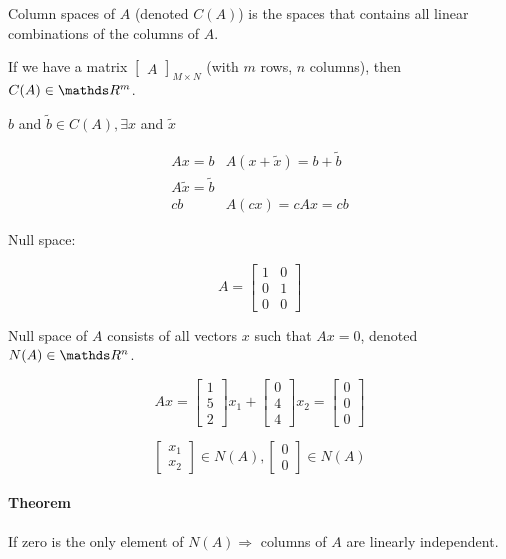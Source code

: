 Column spaces of $A$ (denoted $C(A)$) is the spaces that contains all linear combinations of the columns of $A$.

If we have a matrix $\begin{bmatrix}A\end{bmatrix}_{M \times N}$ (with $m$ rows, $n$ columns), then $C(A) \in \bbR^m$.

$b$ and $\tilde{b} \in C(A), \exists x$ and $\tilde{x}$

\[
	\begin{matrix}
		Ax = b & A(x+\tilde{x}) = b + \tilde{b}\\
		A \tilde{x}  = \tilde{b} \\
		c b & A(cx) = cAx = cb
	\end{matrix}
\]	

Null space:

\[
	A = \begin{bmatrix}
		1 & 0 \\ 0 & 1 \\ 0 & 0
	\end{bmatrix}
\]	

Null space of $A$ consists of all vectors $x$ such that $Ax = 0$, denoted $N(A) \in \bbR^n$.

\[
	Ax = \begin{bmatrix}
		1 \\ 5 \\ 2
	\end{bmatrix} x_1 + 
	\begin{bmatrix}
		0 \\ 4 \\ 4
	\end{bmatrix} x_2 = 
	\begin{bmatrix}
		0 \\ 0 \\ 0
	\end{bmatrix}
\]

\[
	\begin{bmatrix}
		x_1 \\ x_2
	\end{bmatrix} \in N(A),
	\begin{bmatrix}
		0 \\ 0
	\end{bmatrix} \in N(A)
\]

\paragraph{Theorem} If zero is the only element of $N(A) \Rightarrow$ columns of $A$ are linearly independent.


